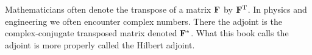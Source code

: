 \par
Mathematicians often denote the transpose of a matrix
$\bold F$ by $\bold F^{\rm T}$.
In physics and engineering we often encounter complex numbers.
There the adjoint is the complex-conjugate transposed matrix
denoted $\bold F^\ast$.
What this book calls the adjoint is more properly called the Hilbert adjoint.

%


